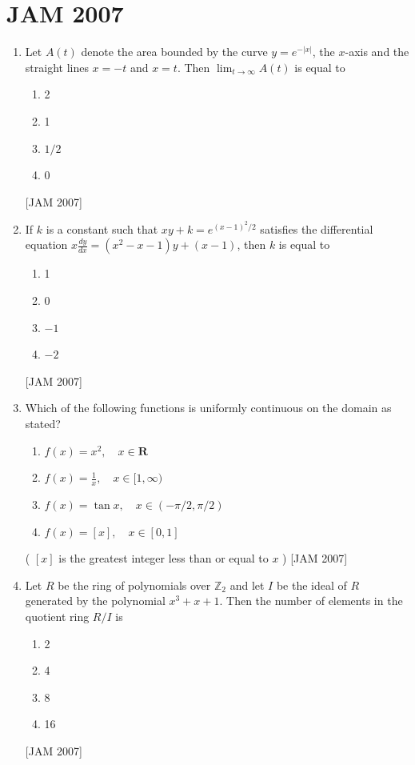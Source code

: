 \newpage

\section{JAM 2007}


\begin{enumerate}
  \item Let $A(t)$ denote the area bounded by the curve $y=e^{-|x|}$, the $x$-axis and the straight lines $x=-t$ and $x=t$. Then $\lim _{t \rightarrow \infty} A(t)$ is equal to
  \begin{enumerate}
    \item 2
    \item 1
    \item $1 / 2$
    \item 0
\end{enumerate}
 \hfill [JAM 2007]


 
\item If $k$ is a constant such that $x y+k=e^{(x-1)^{2} / 2}$ satisfies the differential equation $x \frac{d y}{d x}=\left(x^{2}-x-1\right) y+(x-1)$, then $k$ is equal to
 \begin{enumerate}
\item 1
\item 0
\item $-1$
\item $-2$
\end{enumerate}
 \hfill [JAM 2007]



 
  \item Which of the following functions is uniformly continuous on the domain as stated?
  \begin{enumerate}
    \item $f(x)=x^{2}, \quad x \in \mathbf{R}$
    \item $f(x)=\frac{1}{x}, \quad x \in[1, \infty)$
    \item $f(x)=\tan x, \quad x \in(-\pi / 2, \pi / 2)$
    \item $f(x)=[x], \quad x \in[0,1]$
\end{enumerate}
 
( $[x]$ is the greatest integer less than or equal to $x$ )
\hfill [JAM 2007]




  \item Let $R$ be the ring of polynomials over $\mathbb{Z}_{2}$ and let $I$ be the ideal of $R$ generated by the polynomial $x^{3}+x+1$. Then the number of elements in the quotient ring $R / I$ is
    \begin{enumerate}
\item 2
\item 4
\item 8
\item 16
\end{enumerate}
 \hfill [JAM 2007]





\end{enumerate}
